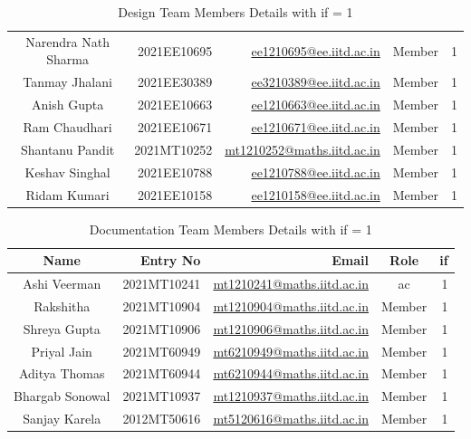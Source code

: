\documentclass[12pt]{article} %
\begin{document}
\begin{table}[h!]
\begin{tabular}{|c|r|r|c|r|}
Narendra Nath Sharma & 2021EE10695 & \href{mailto:ee1210695@ee.iitd.ac.in}{ee1210695@ee.iitd.ac.in} & Member & 1 \\
Tanmay Jhalani & 2021EE30389 & \href{mailto:ee3210389@ee.iitd.ac.in}{ee3210389@ee.iitd.ac.in} & Member & 1 \\
Anish Gupta & 2021EE10663 & \href{mailto:ee1210663@ee.iitd.ac.in}{ee1210663@ee.iitd.ac.in} & Member & 1 \\
Ram Chaudhari & 2021EE10671 & \href{mailto:ee1210671@ee.iitd.ac.in}{ee1210671@ee.iitd.ac.in} & Member & 1 \\

Shantanu Pandit & 2021MT10252 & \href{mailto:mt1210252@maths.iitd.ac.in}{mt1210252@maths.iitd.ac.in} & Member & 1 \\
Keshav Singhal & 2021EE10788 & \href{mailto:ee1210788@ee.iitd.ac.in}{ee1210788@ee.iitd.ac.in} & Member & 1 \\
Ridam Kumari & 2021EE10158 & \href{mailto:ee1210158@ee.iitd.ac.in}{ee1210158@ee.iitd.ac.in} & Member & 1 \\

\hline
\end{tabular}
\caption{Design Team Members Details with \acrshort{if} = 1}
\label{tab:teamDetails}
\end{table}








\begin{table}[h!]
\centering
\begin{tabular}{|c|r|r|c|r|}
\hline
Name & Entry No & Email & Role & \acrshort{if} \\
\hline
Ashi Veerman & 2021MT10241 & \href{mailto:mt1210241@maths.iitd.ac.in}{mt1210241@maths.iitd.ac.in} & \acrshort{ac} & 1 \\
Rakshitha & 2021MT10904 & \href{mailto:mt1210904@maths.iitd.ac.in}{mt1210904@maths.iitd.ac.in} & Member & 1 \\
Shreya Gupta & 2021MT10906 & \href{mailto:mt1210906@maths.iitd.ac.in}{mt1210906@maths.iitd.ac.in} & Member & 1 \\
Priyal Jain & 2021MT60949 & \href{mailto:mt6210949@maths.iitd.ac.in}{mt6210949@maths.iitd.ac.in} & Member & 1 \\
Aditya Thomas & 2021MT60944 & \href{mailto:mt6210944@maths.iitd.ac.in}{mt6210944@maths.iitd.ac.in} & Member & 1 \\
Bhargab Sonowal & 2021MT10937 & \href{mailto:mt1210937@maths.iitd.ac.in}{mt1210937@maths.iitd.ac.in} & Member & 1 \\
Sanjay Karela & 2012MT50616 & \href{mailto:mt5120616@maths.iitd.ac.in}{mt5120616@maths.iitd.ac.in} & Member & 1\\


\hline
\end{tabular}
\caption{Documentation Team Members Details with \acrshort{if} = 1}
\label{tab:teamDetails}
\end{table}
\end{document}
